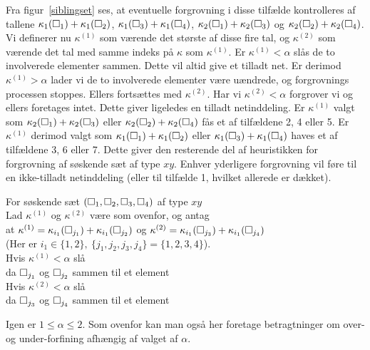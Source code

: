 Fra figur~\ref{siblingset} ses, at eventuelle forgrovning i disse
tilfælde kontrolleres af tallene
$\kappa_1(\Box_1)+\kappa_1(\Box_2)$, $\kappa_1(\Box_3)+\kappa_1(\Box_4)$,
$\kappa_2(\Box_1)+\kappa_2(\Box_3)$ og $\kappa_2(\Box_2)+\kappa_2(\Box_4)$.  
Vi definerer nu $\kappa^{(1)}$ som værende det største af disse fire tal,
og $\kappa^{(2)}$ som værende det tal med samme indeks på $\kappa$ som
$\kappa^{(1)}$. Er $\kappa^{(1)}<\alpha$ slås de to involverede
elementer sammen. Dette vil altid give et tilladt net. Er derimod
$\kappa^{(1)}>\alpha$ lader vi de to involverede elementer være
uændrede, og forgrovnings processen stoppes. Ellers fortsættes med
$\kappa^{(2)}$. Har vi $\kappa^{(2)}<\alpha$
forgrover vi og ellers foretages intet. Dette giver ligeledes en
tilladt netinddeling. Er $\kappa^{(1)}$ valgt som  
$\kappa_2(\Box_1)+\kappa_2(\Box_3)$ eller $\kappa_2(\Box_2)+\kappa_2(\Box_4)$
fås et af tilfældene 2, 4 eller 5. Er $\kappa^{(1)}$ derimod valgt som 
$\kappa_1(\Box_1)+\kappa_1(\Box_2)$ eller $\kappa_1(\Box_3)+\kappa_1(\Box_4)$
haves et af tilfældene 3, 6 eller 7. Dette giver den resterende del af
heuristikken for forgrovning af søskende sæt af type $xy$. Enhver
yderligere forgrovning vil føre til en ikke-tilladt netinddeling
(eller til tilfælde 1, hvilket allerede er dækket).  
\begin{ttitemize}
  \item For søskende sæt $(\Box_1,\Box_2,\Box_3,\Box_4)$ af type $xy$ \\
        \makebox[.25in][r]{} Lad $\kappa^{(1)}$ og $\kappa^{(2)}$ være
          som ovenfor, og antag \\
        \makebox[.25in][r]{} at $\kappa^{(1)}=\kappa_{i_1}(\Box_{j_1}) + 
          \kappa_{i_1}(\Box_{j_2})$ og $\kappa^{(2)}=\kappa_{i_1}(\Box_{j_3}) + 
          \kappa_{i_1}(\Box_{j_4})$ \\
        \makebox[.25in][r]{} (Her er $i_1\in\{1,2\},\ \{j_1,j_2,j_3,j_4\}=
          \{1,2,3,4\}$). \\
        \makebox[.25in][r]{} Hvis $\kappa^{(1)}<\alpha$ slå \\
        \makebox[.5in][r]{} da $\Box_{j_1}$ og $\Box_{j_2}$ sammen til et element \\ 
        \makebox[.5in][r]{} Hvis $\kappa^{(2)}<\alpha$ slå \\
        \makebox[.75in][r]{} da $\Box_{j_3}$ og $\Box_{j_4}$ sammen til et element
\end{ttitemize}
Igen er $1\leq\alpha\leq 2$. Som ovenfor kan man også her foretage
betragtninger om over- og under-forfining afhængig af valget af $\alpha$.

